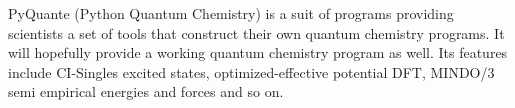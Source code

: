 PyQuante (Python Quantum Chemistry) is a suit of programs providing scientists a set of tools that construct their own quantum chemistry programs. It will hopefully provide a working quantum chemistry program as well. Its features include CI-Singles excited states, optimized-effective potential DFT, MINDO/3 semi empirical energies and forces and so on.